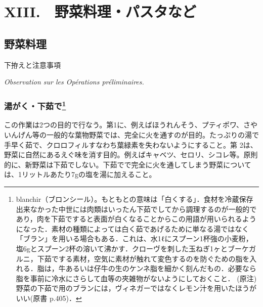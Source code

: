 \hypertarget{legumes-farineux-et-pates-alimentaires}{%
\chapter{XIII.　野菜料理・パスタなど}\label{legumes-farineux-et-pates-alimentaires}}


\hypertarget{serie-des-legumes}{%
\section{野菜料理}\label{serie-des-legumes}}

\begin{center}
\headfont\large 下拵えと注意事項\label{observations-sur-les-operations-preliminaires}

\normalfont\textit{Observation sur les Opérations préliminaires.}
\end{center}

\normalfont\normalsize

\hypertarget{blanchissage}{%
\subsection[湯がく・下茹で]{\texorpdfstring{湯がく・下茹で\footnote{blanchir（ブロンシール）。もともとの意味は「白くする」．食材を冷蔵保存出来なかった中世には肉類はいったん下茹でしてから調理するのが一般的であり，肉を下茹ですると表面が白くなることからこの用語が用いられるようになった．素材の種類によっては白く茹であげるために単なる湯ではなく「ブラン」を用いる場合もある．これは、水1ℓにスプーン1杯強の小麦粉，塩6gとスプーン2杯の溶いて沸かす．クローヴを刺した玉ねぎ1ヶとブーケガルニ，下茹でする素材，空気に素材が触れて変色するのを防ぐための脂を入れる．脂は，牛あるいは仔牛の生のケンネ脂を細かく刻んだもの．必要なら脂を事前に冷水にさらして血等の夾雑物がないようにしておくこと．
  (原注)
  野菜の下茹で用のブランには，ヴィネガーではなくレモン汁を用いたほうがいい(原書
  p.405)．}}{湯がく・下茹で}}\label{blanchissage}}

この作業は2つの目的で行なう。第1に、例えばほうれんそう、プティポワ、さやいんげん等の一般的な葉物野菜では、完全に火を通すのが目的。たっぷりの湯で手早く茹で、クロロフィルすなわち葉緑素を失わないようにすること。第
2は、野菜に自然にあるえぐ味を消す目的。例えばキャベツ、セロリ、シコレ等。原則的に、新野菜は下茹でしない。下茹でで完全に火を通してしまう野菜については、1リットルあたり7gの塩を湯に加えること。

